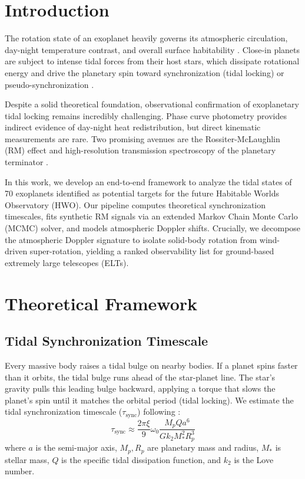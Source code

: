 \documentclass[a4paper,11pt]{article}
\numberwithin{equation}{section}
\begin{document}
\setcounter{page}{1}
\tableofcontents
\setcounter{tocdepth}{2}
\newpage

\section{Introduction}
\label{sec:intro}

The rotation state of an exoplanet heavily governs its atmospheric circulation, day-night temperature contrast, and overall surface habitability \citep{Showman2002}. Close-in planets are subject to intense tidal forces from their host stars, which dissipate rotational energy and drive the planetary spin toward synchronization (tidal locking) or pseudo-synchronization \citep{Goldreich1966, Hut1981}. 

Despite a solid theoretical foundation, observational confirmation of exoplanetary tidal locking remains incredibly challenging. Phase curve photometry provides indirect evidence of day-night heat redistribution, but direct kinematic measurements are rare. Two promising avenues are the Rossiter-McLaughlin (RM) effect \citep{Ohta2005} and high-resolution transmission spectroscopy of the planetary terminator \citep{Snellen2010}. 

In this work, we develop an end-to-end framework to analyze the tidal states of 70 exoplanets identified as potential targets for the future Habitable Worlds Observatory (HWO). Our pipeline computes theoretical synchronization timescales, fits synthetic RM signals via an extended Markov Chain Monte Carlo (MCMC) solver, and models atmospheric Doppler shifts. Crucially, we decompose the atmospheric Doppler signature to isolate solid-body rotation from wind-driven super-rotation, yielding a ranked observability list for ground-based extremely large telescopes (ELTs).

\section{Theoretical Framework}
\label{sec:theory}

\subsection{Tidal Synchronization Timescale}
Every massive body raises a tidal bulge on nearby bodies. If a planet spins faster than it orbits, the tidal bulge runs ahead of the star-planet line. The star's gravity pulls this leading bulge backward, applying a torque that slows the planet's spin until it matches the orbital period (tidal locking). We estimate the tidal synchronization timescale ($\tau_{\text{sync}}$) following \citet{Gladman1996}:
\begin{equation}
    \tau_{\text{sync}} \approx \frac{2\pi \xi}{9} \omega_0 \frac{M_p Q a^6}{G k_2 M_*^2 R_p^3}
\end{equation}
where $a$ is the semi-major axis, $M_p, R_p$ are planetary mass and radius, $M_*$ is stellar mass, $Q$ is the specific tidal dissipation function, and $k_2$ is the Love number. 
\end{document}
